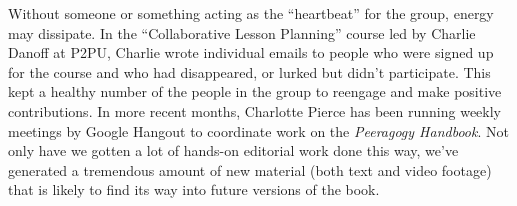 Without someone or something acting as the ``heartbeat'' for the group,
energy may dissipate. In the ``Collaborative Lesson Planning'' course
led by Charlie Danoff at P2PU, Charlie wrote individual emails to people
who were signed up for the course and who had disappeared, or lurked but
didn't participate. This kept a healthy number of the people in the
group to reengage and make positive contributions. In more recent
months, Charlotte Pierce has been running weekly meetings by Google
Hangout to coordinate work on the \emph{Peeragogy Handbook}. Not only
have we gotten a lot of hands-on editorial work done this way, we've
generated a tremendous amount of new material (both text and video
footage) that is likely to find its way into future versions of the
book.
